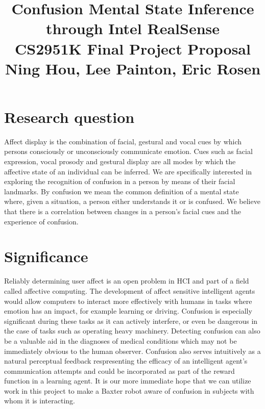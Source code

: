 \documentclass[12pt,letterpaper]{article}
\begin{document}
\title{Confusion Mental State Inference \\through Intel RealSense\\ \vspace{2 mm} {\large CS2951K Final Project Proposal}\\ {\small Ning Hou, Lee Painton, Eric Rosen}}

\maketitle

\section{Research question}
Affect display is the combination of facial, gestural and vocal cues by which persons consciously or unconsciously communicate emotion.  Cues such as facial expression, vocal prosody and gestural display are all modes by which the affective state of an individual can be inferred.  We are specifically interested in exploring the recognition of confusion in a person by means of their facial landmarks.  By confusion we mean the common definition of a mental state where, given a situation, a person either understands it or is confused.  We believe that there is a correlation between changes in a person's facial cues and the experience of confusion.

\section{Significance}
Reliably determining user affect is an open problem in HCI and part of a field called affective computing.  The development of affect sensitive intelligent agents would allow computers to interact more effectively with humans in tasks where emotion has an impact, for example learning or driving.  Confusion is especially significant during these tasks as it can actively interfere, or even be dangerous in the case of tasks such as operating heavy machinery.  Detecting confusion can also be a valuable aid in the diagnoses of medical conditions which may not be immediately obvious to the human observer.  Confusion also serves intuitively as a natural perceptual feedback respresenting the efficacy of an intelligent agent's communication attempts and could be incorporated as part of the reward function in a learning agent.  It is our more immediate hope that we can utilize work in this project to make a Baxter robot aware of confusion in subjects with whom it is interacting.
\end{document}
